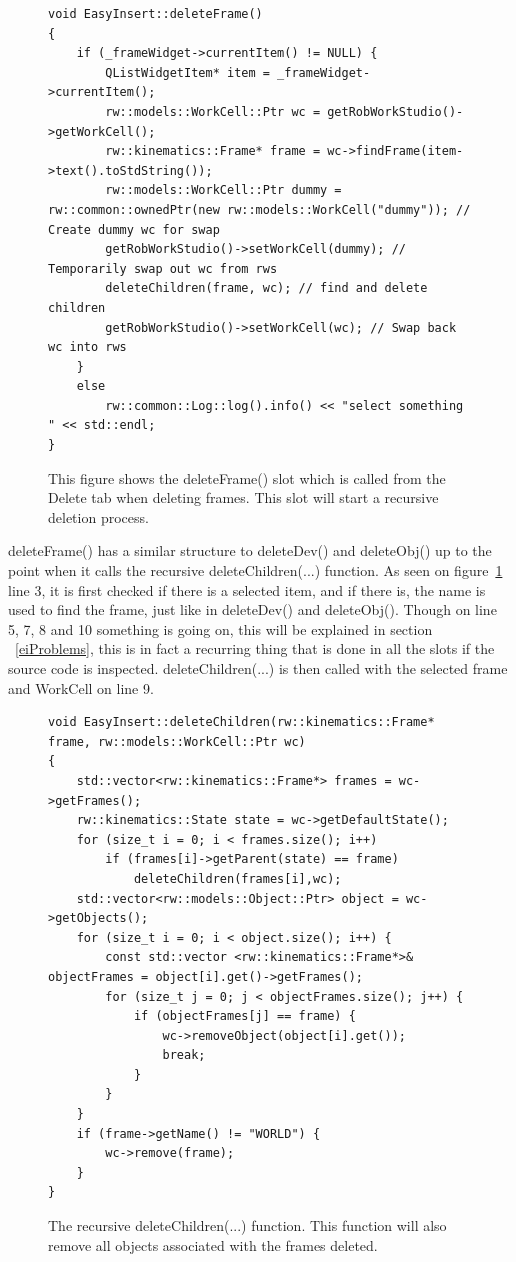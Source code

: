 \begin{figure}[h] %
\centering
\lstset{language=C++} 
\begin{lstlisting}[frame=single]  
void EasyInsert::deleteFrame()
{
    if (_frameWidget->currentItem() != NULL) {
        QListWidgetItem* item = _frameWidget->currentItem();
        rw::models::WorkCell::Ptr wc = getRobWorkStudio()->getWorkCell();
        rw::kinematics::Frame* frame = wc->findFrame(item->text().toStdString());
        rw::models::WorkCell::Ptr dummy = rw::common::ownedPtr(new rw::models::WorkCell("dummy")); // Create dummy wc for swap
        getRobWorkStudio()->setWorkCell(dummy); // Temporarily swap out wc from rws
        deleteChildren(frame, wc); // find and delete children
        getRobWorkStudio()->setWorkCell(wc); // Swap back wc into rws
    }
    else
        rw::common::Log::log().info() << "select something " << std::endl;
}
\end{lstlisting}
\caption{This figure shows the deleteFrame() slot which is called from the Delete tab when deleting frames. This slot will start a recursive deletion process.}
\label{fig:eiDeleteFrames} 	
\end{figure}

deleteFrame() has a similar structure to deleteDev() and deleteObj() up to the point when it calls the recursive deleteChildren(...) function. As seen on figure~\ref{fig:eiDeleteFrames} line 3, it is first checked if there is a selected item, and if there is, the name is used to find the frame, just like in deleteDev() and deleteObj(). Though on line 5, 7, 8 and 10 something is going on, this will be explained in section ~\ref{eiProblems}, this is in fact a recurring thing that is done in all the slots if the source code is inspected. 
deleteChildren(...) is then called with the selected frame and WorkCell on line 9.

\begin{figure}[h] %
\centering
\lstset{language=C++} 
\begin{lstlisting}[frame=single]  
void EasyInsert::deleteChildren(rw::kinematics::Frame* frame, rw::models::WorkCell::Ptr wc)
{
    std::vector<rw::kinematics::Frame*> frames = wc->getFrames();
    rw::kinematics::State state = wc->getDefaultState();
    for (size_t i = 0; i < frames.size(); i++)
        if (frames[i]->getParent(state) == frame)
            deleteChildren(frames[i],wc);
    std::vector<rw::models::Object::Ptr> object = wc->getObjects();
    for (size_t i = 0; i < object.size(); i++) {
        const std::vector <rw::kinematics::Frame*>& objectFrames = object[i].get()->getFrames();
        for (size_t j = 0; j < objectFrames.size(); j++) {
            if (objectFrames[j] == frame) {
                wc->removeObject(object[i].get());
                break;
            }
        }
    }
    if (frame->getName() != "WORLD") {
        wc->remove(frame);
    }
}
\end{lstlisting}
\caption{The recursive deleteChildren(...) function. This function will also remove all objects associated with the frames deleted.}
\label{fig:eiDeleteChildren} 	
\end{figure}

